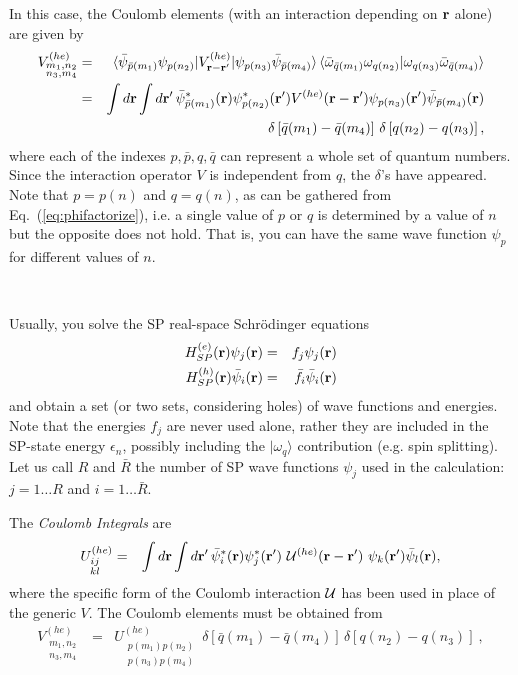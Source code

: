 \documentclass[12pt,twoside]{article}
\begin{document}
In this case, the Coulomb elements (with an interaction depending on
${\bf r}$ alone) are given by
\begin{eqnarray}
V_{\substack{m_1,n_2\\n_3,m_4}}^{(he)}&=&
\langle\bar\psi_{\bar p(m_1)} \psi_{p(n_2)}| V^{(he)}_{{\bf r}-{\bf r'}} 
|\psi_{p(n_3)} \bar\psi_{\bar p(m_4)}\rangle \,
\langle\bar\omega_{\bar q(m_1)} \omega_{q(n_2)} |
\omega_{q(n_3)} \bar\omega_{\bar q(m_4)}\rangle
\\
&=&\int d{\bf r} \int d{\bf r'} \, \bar\psi^*_{\bar p(m_1)}({\bf r}) 
\psi^*_{p(n_2)}({\bf r'}) V^{(he)}({\bf r}-{\bf r'}) 
\psi_{p(n_3)}({\bf r'}) \bar\psi_{\bar p(m_4)}({\bf r})
\\  \nonumber
&& \delta\left[\bar q(m_1)-\bar q(m_4)\right] \, \delta\left[q(n_2)-q(n_3)\right] ,
\end{eqnarray}
where each of the indexes $p, \bar p, q, \bar q$ can represent a whole
set of quantum numbers.  Since the interaction operator $V$ is
independent from $q$, the $\delta$'s have appeared.  Note that
$p=p(n)$ and $q=q(n)$, as can be gathered from
Eq.~(\ref{eq:phifactorize}), i.e. a single value of $p$ or $q$ is
determined by a value of $n$ but the opposite does not hold. That is,
you can have the same wave function $\psi_p$ for different values of
$n$.

\

Usually, you solve the SP real-space Schr\"odinger equations
\begin{eqnarray} \label{schroedrealspace}
H_{SP}^{(e)}({\bf r}) \psi_j({\bf r}) 
&=& f_j \psi_j({\bf r}) \\
H_{SP}^{(h)}({\bf r}) \bar\psi_i({\bf r})
&=& \bar f_i \bar\psi_i({\bf r})
\end{eqnarray}
and obtain a set (or two sets, considering holes) of wave functions
and energies. Note that the energies $f_j$ are never used alone,
rather they are included in the SP-state energy $\epsilon_n$, possibly
including the $|\omega_q\rangle$ contribution (e.g. spin splitting).
Let us call $R$ and $\bar R$ the number of SP wave functions $\psi_j$
used in the calculation: $j=1\dots R$ and $i=1\dots \bar R$.

The \emph{Coulomb Integrals} are
\begin{eqnarray}
U_{\substack{ij\\kl}}^{(he)}&=&
\int d{\bf r} \int d{\bf r'} \, \bar\psi^*_{i}({\bf r}) 
\psi^*_{j}({\bf r'}) \ {\cal U}^{(he)}({\bf r}-{\bf r'}) \
\psi_{k}({\bf r'}) \bar\psi_{l}({\bf r}) ,
\end{eqnarray}
where the specific form of the Coulomb interaction ${\cal U}$ has been
used in place of the generic $V$. The Coulomb elements must be obtained from
\begin{eqnarray}
V_{\substack{m_1,n_2\\n_3,m_4}}^{(he)}&=&
U_{\substack{p(m_1) p(n_2)\\p(n_3) p(m_4)}}^{(he)} \
\delta\left[\bar q(m_1)-\bar q(m_4)\right] \, \delta\left[q(n_2)-q(n_3)\right] \ ,
\end{eqnarray}
\end{document}
